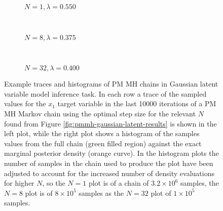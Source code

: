 \begin{figure}
\centering
\begin{subfigure}[b]{\linewidth}
\centering
  \vspace{-5mm}
  \caption{$N=1, \lambda=0.550$}
  \label{sfig:pm-mh-1-gaussian-latent-trace}
\end{subfigure}
\\[3mm]
\begin{subfigure}[b]{\linewidth}
\centering
  \vspace{-5mm}
  \caption{$N=8, \lambda=0.375$}
  \label{sfig:pm-mh-8-gaussian-latent-trace}
\end{subfigure}
\\[3mm]
\begin{subfigure}[b]{\linewidth}
\centering
  \vspace{-5mm}
  \caption{$N=32, \lambda=0.400$}
  \label{sfig:pm-mh-32-gaussian-latent-trace}
\end{subfigure}
\caption[\acs{PM} \acs{MH} Gaussian model traces.]{
Example traces and histograms of \ac{PM} \ac{MH} chains in Gaussian latent variable model inference task. In each row a trace of the sampled values for the $x_1$ target variable in the last 10000 iterations of a \ac{PM} \ac{MH} Markov chain using the optimal step size for the relevant $N$ found from Figure \ref{fig:pmmh-gaussian-latent-results} is shown in the left plot, while the right plot shows a histogram of the samples values from the full chain (green filled region) against the exact marginal posterior density (orange curve). In the histogram plots the number of samples in the chain used to produce the plot have been adjusted to account for the increased number of density evaluations for higher $N$, so the $N=1$ plot is of a chain of $3.2\times 10^6$ samples, the $N=8$ plot is of $8\times 10^5$ samples as the $N=32$ plot of $1 \times 10^5$ samples.}
\label{fig:pmmh-gaussian-latent-traces}
\end{figure}

